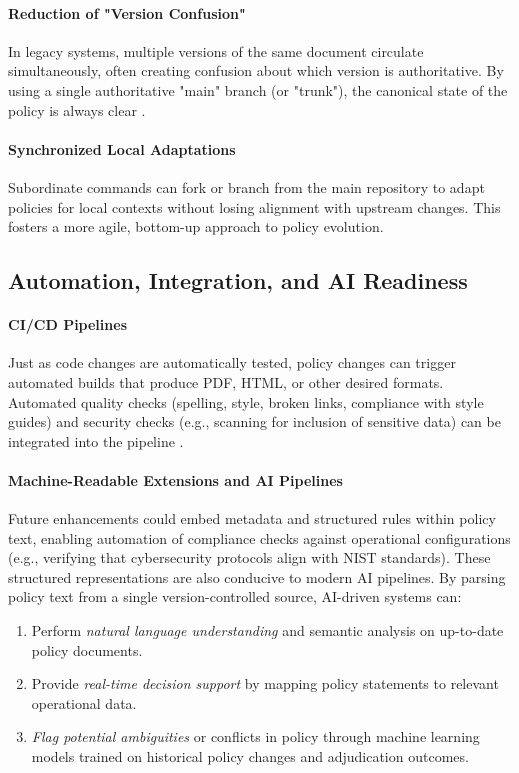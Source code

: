 \documentclass[11pt]{article}
\begin{document}
	\paragraph{Reduction of "Version Confusion"}
	In legacy systems, multiple versions of the same document circulate simultaneously, often creating confusion about which version is authoritative. By using a single authoritative "main" branch (or "trunk"), the canonical state of the policy is always clear \cite{Appleton2020}.

	\paragraph{Synchronized Local Adaptations}
	Subordinate commands can fork or branch from the main repository to adapt policies for local contexts without losing alignment with upstream changes. This fosters a more agile, bottom-up approach to policy evolution.

	\subsection{Automation, Integration, and AI Readiness}

	\paragraph{CI/CD Pipelines}
	Just as code changes are automatically tested, policy changes can trigger automated builds that produce PDF, HTML, or other desired formats. Automated quality checks (spelling, style, broken links, compliance with style guides) and security checks (e.g., scanning for inclusion of sensitive data) can be integrated into the pipeline \cite{FowlerHighsmith2001}.

	\paragraph{Machine-Readable Extensions and AI Pipelines}
	Future enhancements could embed metadata and structured rules within policy text, enabling automation of compliance checks against operational configurations (e.g., verifying that cybersecurity protocols align with NIST standards). These structured representations are also conducive to modern AI pipelines. By parsing policy text from a single version-controlled source, AI-driven systems can:

	\begin{enumerate}
		\item Perform \textit{natural language understanding} and semantic analysis on up-to-date policy documents.
		\item Provide \textit{real-time decision support} by mapping policy statements to relevant operational data.
		\item \textit{Flag potential ambiguities} or conflicts in policy through machine learning models trained on historical policy changes and adjudication outcomes.
	\end{enumerate}
\end{document}
